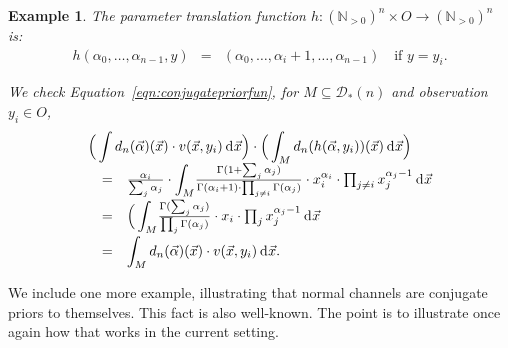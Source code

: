 \documentclass{mscs}
\newcommand{\Dst}{\mathcal{D}}
\newcommand{\NNO}{\mathbb{N}}
\newcommand{\intd}{{\kern.2em}\mathrm{d}{\kern.03em}}
\newtheorem{example}[theorem]{Example}
\begin{document}
\begin{example}
The parameter translation function $h\colon (\NNO_{>0})^{n} \times O
\rightarrow (\NNO_{>0})^{n}$ is:
\[ \begin{array}{rcl}
h(\alpha_{0}, \ldots, \alpha_{n-1}, y)
& = &
(\alpha_{0}, \ldots, \alpha_{i}+1, \ldots, \alpha_{n-1})
\quad \mbox{if } y=y_{i}.
\end{array} \]

\noindent We check Equation~\eqref{eqn:conjugatepriorfun}, for $M\subseteq
\Dst_{*}(n)$ and observation $y_{i}\in O$,
\[ \begin{array}{rcl}
\lefteqn{\displaystyle
  \Big(\int d_{n}(\vec{\alpha})(\vec{x})\cdot v(\vec{x},y_{i})\intd\vec{x}\Big)
   \cdot \Big(\int_{M} d_{n}(h(\vec{\alpha},y_{i}))(\vec{x}) \intd \vec{x}\Big)}
\\[+0.4em]
& = &
\frac{\alpha_i}{\sum_{j}\alpha_{j}} \cdot 
{\displaystyle\int_{M}} 
   \frac{\Gamma(1 + \sum_{j}\alpha_{j})}
   {\Gamma(\alpha_{i}+1)\cdot \prod_{j\neq i}\Gamma(\alpha_{j})} \cdot
   x_{i}^{\alpha_i} \cdot \prod_{j\neq i} x_{j}^{\alpha_{j}-1} \intd \vec{x}
\\[+0.8em]
& = &
{\displaystyle\Big(\int_{M}} 
   \frac{\Gamma(\sum_{j}\alpha_{j})}
   {\prod_{j}\Gamma(\alpha_{j})} \cdot
   x_{i} \cdot \prod_{j} x_{j}^{\alpha_{j}-1} \intd \vec{x}
\\[+0.8em]
& = &
\displaystyle\int_{M} d_{n}(\vec{\alpha})(\vec{x})\cdot 
   v(\vec{x},y_{i})\intd\vec{x}.
\end{array} \]

\end{example}



We include one more example, illustrating that normal channels are
conjugate priors to themselves. This fact is also well-known. The
point is to illustrate once again how that works in the current
setting.
\end{document}
